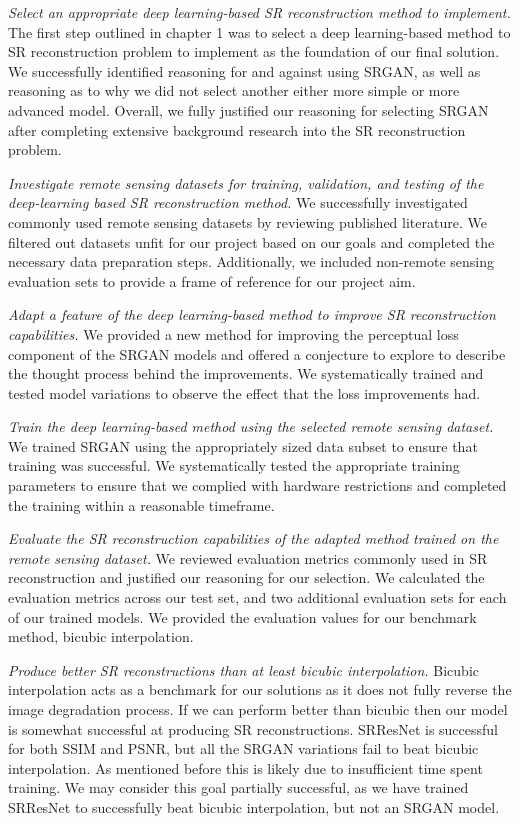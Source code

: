 \textit{Select an appropriate deep learning-based SR reconstruction method to implement.} The first step outlined in chapter 1 was to select a deep learning-based method to SR reconstruction problem to implement as the foundation of our final solution. We successfully identified reasoning for and against using SRGAN, as well as reasoning as to why we did not select another either more simple or more advanced model. Overall, we fully justified our reasoning for selecting SRGAN after completing extensive background research into the SR reconstruction problem.

\textit{Investigate remote sensing datasets for training, validation, and testing of the deep-learning based SR reconstruction method.} We successfully investigated commonly used remote sensing datasets by reviewing published literature. We filtered out datasets unfit for our project based on our goals and completed the necessary data preparation steps. Additionally, we included non-remote sensing evaluation sets to provide a frame of reference for our project aim. 

\textit{Adapt a feature of the deep learning-based method to improve SR reconstruction capabilities.} We provided a new method for improving the perceptual loss component of the SRGAN models and offered a conjecture to explore to describe the thought process behind the improvements. We systematically trained and tested model variations to observe the effect that the loss improvements had.

\textit{Train the deep learning-based method using the selected remote sensing dataset.} We trained SRGAN using the appropriately sized data subset to ensure that training was successful. We systematically tested the appropriate training parameters to ensure that we complied with hardware restrictions and completed the training within a reasonable timeframe.

\textit{Evaluate the SR reconstruction capabilities of the adapted method trained on the remote sensing dataset.} We reviewed evaluation metrics commonly used in SR reconstruction and justified our reasoning for our selection. We calculated the evaluation metrics across our test set, and two additional evaluation sets for each of our trained models. We provided the evaluation values for our benchmark method, bicubic interpolation.

\textit{Produce better SR reconstructions than at least bicubic interpolation.} Bicubic interpolation acts as a benchmark for our solutions as it does not fully reverse the image degradation process. If we can perform better than bicubic then our model is somewhat successful at producing SR reconstructions. SRResNet is successful for both SSIM and PSNR, but all the SRGAN variations fail to beat bicubic interpolation. As mentioned before this is likely due to insufficient time spent training. We may consider this goal partially successful, as we have trained SRResNet to successfully beat bicubic interpolation, but not an SRGAN model.

